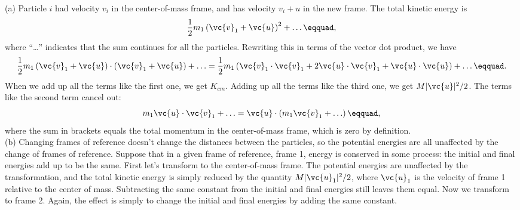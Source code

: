 (a) Particle $i$ had velocity $v_i$ in the center-of-mass
frame, and has velocity $v_i+u$ in the new frame. The
total kinetic energy is
\begin{equation*}
 \frac{1}{2}m_1\left(\vc{v}_1+\vc{u}\right)^2+\ldots\eqquad,
\end{equation*}
where ``\ldots'' indicates that the sum continues for all the
particles. Rewriting this in terms of the vector dot product, we have
\begin{equation*}
 \frac{1}{2}m_1\left(\vc{v}_1+\vc{u}\right)\cdot\left(\vc{v}_1+\vc{u}\right)+\ldots
 = \frac{1}{2}m_1\left(\vc{v}_1\cdot\vc{v}_1+2\vc{u}\cdot\vc{v}_1+\vc{u}\cdot\vc{u}\right) + \ldots\eqquad.
\end{equation*}
When we add up all the terms like the first one, we get
$K_{cm}$. Adding up all the terms like the third one, we get
$M|\vc{u}|^2/2$. The terms like the second term cancel out:
\begin{equation*}
  m_1\vc{u}\cdot\vc{v}_1 + \ldots
			 =     \vc{u}\cdot\left(m_1\vc{v}_1+\ldots\right)\eqquad,  
\end{equation*}
where the sum in brackets equals the total momentum in the
center-of-mass frame, which is zero by definition.\\
(b) Changing frames of reference doesn't change the distances
between the particles, so the potential energies are all
unaffected by the change of frames of reference. Suppose
that in a given frame of reference, frame 1, energy is
conserved in some process: the initial and final energies
add up to be the same. First let's transform to the
center-of-mass frame. The potential energies are unaffected
by the transformation, and the total kinetic energy is
simply reduced by the quantity $M |\vc{u}_1|^2/2$, where $\vc{u}_1$ is
the velocity of frame 1 relative to the center of mass.
Subtracting the same constant from the initial and final
energies still leaves them equal. Now we transform to frame
2. Again, the effect is simply to change the initial and
final energies by adding the same constant.



